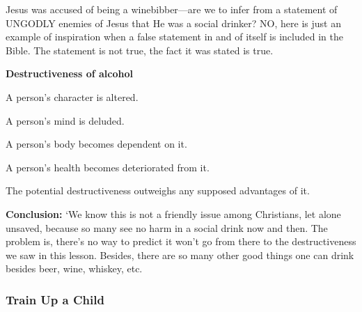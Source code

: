 \begin{compactenum}[I.]
\begin{compactenum}[A.]
    	\item Jesus was accused of being a winebibber—are we to infer from a statement of UNGODLY enemies of Jesus that He was a social drinker?  NO, here is just an example of inspiration when a false statement in and of itself is included in the Bible.  The statement is not true, the fact it was stated is true.
    \end{compactenum}
    \item \textbf{Destructiveness of alcohol} 
    \begin{compactenum}[A.]
    	\item A person’s character is altered.
    	\item A person’s mind is deluded.
    	\item  A person’s body becomes dependent on it.
    	\item A person’s health becomes deteriorated from it.
    	\item The potential destructiveness outweighs any supposed advantages of it.\\
    \end{compactenum}
\end{compactenum}
\textbf{Conclusion: } `We know this is not a friendly issue among Christians, let alone unsaved, because so many see no harm in a social drink now and then.  The problem is, there’s no way to predict it won’t go from there to the destructiveness we saw in this lesson.  Besides, there are so many other good things one can drink besides beer, wine, whiskey, etc.




\subsubsection{Train Up a Child}


